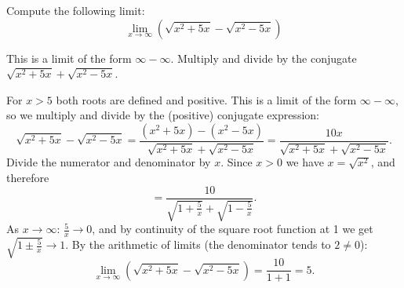 
\begin{question}
Compute the following limit:
\[
\lim_{x\to\infty}\left(\sqrt{x^2+5x}-\sqrt{x^2-5x}\right)
\]
\end{question}

\begin{hint}
This is a limit of the form $\infty-\infty$. Multiply and divide by the conjugate $\sqrt{x^2+5x}+\sqrt{x^2-5x}$.
\end{hint}

\begin{solution}
For $x>5$ both roots are defined and positive. This is a limit of the form $\infty-\infty$, so we multiply and divide by the (positive) conjugate expression:
\[
\sqrt{x^2+5x}-\sqrt{x^2-5x}
=\frac{(x^2+5x)-(x^2-5x)}{\sqrt{x^2+5x}+\sqrt{x^2-5x}}
=\frac{10x}{\sqrt{x^2+5x}+\sqrt{x^2-5x}} .
\]
Divide the numerator and denominator by $x$. Since $x>0$ we have $x=\sqrt{x^2}$, and therefore
\[
=\frac{10}{\sqrt{1+\frac5x}+\sqrt{1-\frac5x}} .
\]
As $x\to\infty$: $\frac5x\to 0$, and by continuity of the square root function at 1 we get $\sqrt{1\pm\frac5x}\to 1$. By the arithmetic of limits (the denominator tends to $2\neq 0$):
\[
\lim_{x\to\infty}\left(\sqrt{x^2+5x}-\sqrt{x^2-5x}\right)=\frac{10}{1+1}=\boxed{5}.
\]
\end{solution}
